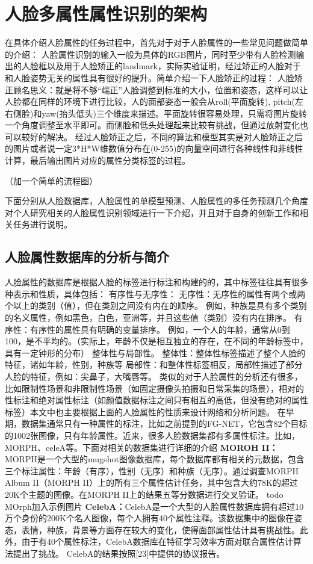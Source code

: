 \chapter{人脸多属性属性识别的架构}
在具体介绍人脸属性的任务过程中，首先对于对于人脸属性的一些常见问题做简单的介绍：
人脸属性识别的输入一般为具体的RGB图片，同时至少带有人脸检测输出的人脸框以及用于人脸矫正的landmark，实际实验证明，经过矫正的人脸对于和人脸姿势无关的属性具有很好的提升。简单介绍一下人脸矫正的过程：
人脸矫正顾名思义：就是将不够“端正”人脸调整到标准的大小，位置和姿态，这样可以让人脸都在同样的环境下进行比较，人的面部姿态一般会从roll(平面旋转), pitch(左右侧脸)和yaw(抬头低头)三个维度来描述。平面旋转很容易处理，只需将图片旋转一个角度调整至水平即可。而侧脸和低头处理起来比较有挑战，但通过放射变化也可以较好的解决。
经过人脸矫正之后，不同的算法和模型其实是对人脸矫正之后的图片或者说一定3*H*W维数值分布在(0-255)的向量空间进行各种线性和非线性计算，最后输出图片对应的属性分类标签的过程。

（加一个简单的流程图）

下面分别从人脸数据库，人脸属性的单模型预测、人脸属性的多任务预测几个角度对个人研究相关的人脸属性识别领域进行一下介绍，并且对于自身的创新工作和相关任务进行说明。
\section{人脸属性数据库的分析与简介}
人脸属性的数据库是根据人脸的标签进行标注和构建的的，其中标签往往具有很多种表示和性质，具体包括：
有序性与无序性：
无序性：无序性的属性有两个或两个以上的类别（值），但在类别之间没有内在的顺序。 例如，种族是具有多个类别的名义属性，例如黑色，白色，亚洲等，并且这些值（类别）没有内在排序。
有序性：有序性的属性具有明确的变量排序。 例如，一个人的年龄，通常从0到100，是不平均的。（实际上，年龄不仅是相互独立的存在，在不同的年龄标签中，具有一定钟形的分布）
整体性与局部性。 
整体性：整体性标签描述了整个人脸的特征，诸如年龄，性别，种族等
局部性：和整体性标签相反，局部性描述了部分人脸的特征，例如：尖鼻子，大嘴唇等。
类似的对于人脸属性的分析还有很多，比如限制性场景和非限制性场景（如固定摄像头拍摄和日常采集的场景），相对的性标注和绝对属性标注（如颜值数据标注之间只有相互的高低，但没有绝对的属性标签）本文中也主要根据上面的人脸属性的性质来设计网络和分析问题。
在早期，数据集通常只有一种属性的标注，比如之前提到的FG-NET，它包含82个目标的1002张图像，只有年龄属性。近来，很多人脸数据集都有多属性标注。比如，MORPH、celeA等。下面对相关的数据集进行详细的介绍
\textbf{MOROH II：}MORPH是一个大型的mugshot图像数据库，每个数据库都有相关的元数据，包含三个标注属性：年龄（有序），性别（无序）和种族（无序）。通过调查MORPH Album II（MORPH II）上的所有三个属性估计任务，其中包含大约78K的超过20K个主题的图像。在MORPH II上的结果五等分数据进行交叉验证。
{todo MOrph加入示例图片}
\textbf{CelebA：}CelebA是一个大型的人脸属性数据库拥有超过10万个身份的200K个名人图像，每个人拥有40个属性注释。该数据集中的图像在姿态，表情，种族，背景等方面存在较大的变化，使得面部属性估计具有挑战性。此外，由于有40个属性标注，CelebA数据库在特征学习效率方面对联合属性估计算法提出了挑战。 CelebA的结果按照[23]中提供的协议报告。 


